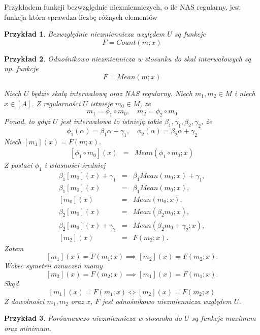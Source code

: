 \documentclass[12pt,a4paper]{report}
\newtheorem{przyklad}{Przykład}
\newcommand{\domkniecie}[1]{\left\lbrack{#1}\right\rbrack}
\begin{document}
Przykładem funkcji bezwzględnie niezmienniczych, o ile NAS regularny, jest funkcja która sprawdza liczbę różnych elementów
\begin{przyklad}
Bezwzględnie niezmiennicza względem $U$ są funkcje 
$$
F=Count(m;x)
$$
\end{przyklad}
\begin{przyklad}
Odnośnikowo niezmiennicza w stosunku do skal interwałowych są np. funkcje
$$
F=Mean(m;x)
$$ 

Niech $U$ będzie skalą interwałową oraz NAS regularny.
Niech $m_1,m_2\in M$ i niech $x\in \domkniecie{A}$. Z regularności $U$ istnieje $m_0 \in M$, że
$$
m_1 = \phi_1 \circ m_0, \quad m_2=\phi_2\circ m_0
$$
Ponad, to gdyż $U$ jest interwałowa to istnieją takie $\beta_{1}, \gamma_{1}, \beta_{2}, \gamma_{2}$, że
$$
\phi_1(\alpha)=\beta_1 \alpha + \gamma_1, \quad \phi_2(\alpha)=\beta_2 \alpha + \gamma_2
$$
Niech $\domkniecie{m_1}(x)=F(m;x)$.
\begin{eqnarray*}
\domkniecie{\phi_1\circ m_0}(x) & = & Mean(\phi_1\circ m_0;x) 
\end{eqnarray*}
Z postaci $\phi_{1}$ i własności średniej
\begin{eqnarray*}
\beta_1\domkniecie{m_0}(x)+ \gamma_1 & = & \beta_1 Mean(m_0;x) + \gamma_1, \\
\beta_1\domkniecie{m_0}(x) & = & \beta_1 Mean(m_0;x), \\
\domkniecie{m_0}(x) & = & Mean(m_0;x), \\
\beta_2\domkniecie{m_0}(x) & = & Mean(\beta_2 m_0;x), \\
\beta_2\domkniecie{m_0}(x) + \gamma_2 & = & Mean(\beta_2 m_0 + \gamma_2;x),  \\
\domkniecie{m_2}(x) & = & F(m_2;x) .
\end{eqnarray*}
Zatem
$$
\domkniecie{m_1}(x)=F(m_1;x) \implies \domkniecie{m_2}(x)=F(m_2;x).
$$
Wobec symetrii oznaczeń mamy
$$
\domkniecie{m_2}(x)=F(m_2;x) \implies \domkniecie{m_1}(x)=F(m_1;x).
$$
Skąd
$$
\domkniecie{m_1}(x)=F(m_1;x) \iff \domkniecie{m_2}(x)=F(m_2;x)
$$
Z dowolności $m_1,m_2$ oraz $x$, $F$ jest odnośnikowo niezmiennicza względem $U$.
\end{przyklad}
\begin{przyklad}
Porównawczo niezmiennicza w stosunku do $U$ są funkcje maximum oraz minimum.
\end{przyklad}
\end{document}
